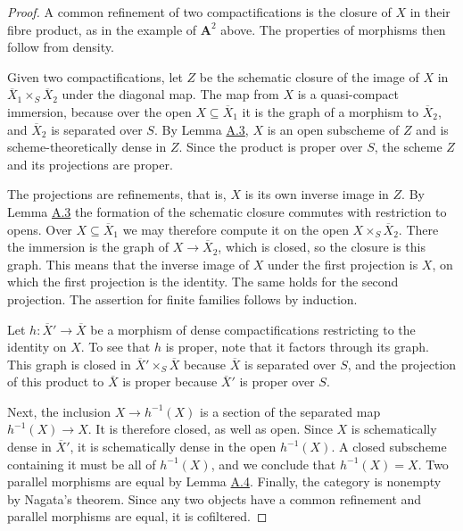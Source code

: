 \documentclass[11pt]{article}
\begin{document}
\begin{proof}[{Proof}]\label{bp22}%
A common refinement of two compactifications is the closure of \(X\) in their fibre product, as in the example of \(\mathbf A^2\) above. The properties of morphisms then follow from density.

Given two compactifications, let \(Z\) be the schematic closure of the image of \(X\) in \(\overline X_1\times_S\overline X_2\) under the diagonal map. The map from \(X\) is a quasi-compact immersion, because over the open \(X\subseteq\overline X_1\) it is the graph of a morphism to \(\overline X_2\), and \(\overline X_2\) is separated over \(S\). By Lemma \hyperref[bp11]{A.3}, \(X\) is an open subscheme of \(Z\) and is scheme-theoretically dense in \(Z\). Since the product is proper over \(S\), the scheme \(Z\) and its projections are proper.

The projections are refinements, that is, \(X\) is its own inverse image in \(Z\). By Lemma \hyperref[bp11]{A.3} the formation of the schematic closure commutes with restriction to opens. Over \(X\subseteq\overline X_1\) we may therefore compute it on the open \(X\times_S\overline X_2\). There the immersion is the graph of \(X\to\overline X_2\), which is closed, so the closure is this graph. This means that the inverse image of \(X\) under the first projection is \(X\), on which the first projection is the identity. The same holds for the second projection. The assertion for finite families follows by induction.

Let \(h:\overline X'\to\overline X\) be a morphism of dense compactifications restricting to the identity on \(X\). To see that \(h\) is proper, note that it factors through its graph. This graph is closed in \(\overline X'\times_S\overline X\) because \(\overline X\) is separated over \(S\), and the projection of this product to \(\overline X\) is proper because \(\overline X'\) is proper over \(S\).

Next, the inclusion \(X\to h^{-1}(X)\) is a section of the separated map \(h^{-1}(X)\to X\). It is therefore closed, as well as open. Since \(X\) is schematically dense in \(\overline X'\), it is schematically dense in the open \(h^{-1}(X)\). A closed subscheme containing it must be all of \(h^{-1}(X)\), and we conclude that \(h^{-1}(X)=X\). Two parallel morphisms are equal by Lemma \hyperref[bp14]{A.4}. Finally, the category is nonempty by Nagata's theorem. Since any two objects have a common refinement and parallel morphisms are equal, it is cofiltered.
\end{proof}
\end{document}
